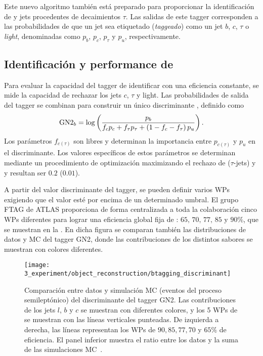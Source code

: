 Este nuevo algoritmo también está preparado para proporcionar la identificación de \cjets y jets procedentes de decaimientos \(\tau\). Las salidas de este tagger corresponden a las probabilidades de que un jet sea etiquetado (\textit{taggeado}) como un jet \(b\), \(c\), \(\tau\) o \textit{light}, denominadas como \(p_b\), \(p_c\), \(p_{\tau}\) y \(p_u\), respectivamente.

\subsection{Identificación y performance de \btagging}

Para evaluar la capacidad del tagger de identificar \bjets con una eficiencia constante, se mide la capacidad de rechazar los jets \(c\), \(\tau\) y light. Las probabilidades de salida del tagger se combinan para construir un único discriminante \gntb, definido como
\begin{equation}
    \text{GN2}_{b} = \log \left(
        \frac{p_b}{f_c p_c + f_{\tau} p_{\tau} + \left(1-f_c-f_{\tau}\right)p_u}
    \right).
\end{equation}
Los parámetros \(f_{c(\tau)}\) son libres y determinan la importancia entre \(p_{c(\tau)}\) y \(p_u\) en el discriminante. Los valores específicos de estos parámetros se determinan mediante un procedimiento de optimización maximizando el rechazo de \cjets (\(\tau\)-jets) y \ljets y resultan ser \(0.2\) (\(0.01\)).


A partir del valor discriminante del tagger, se pueden definir varios \acp{WP} exigiendo que el valor \gntb esté por encima de un determinado umbral. El grupo \ac{FTAG} de \ac{ATLAS} proporciona de forma centralizada a toda la colaboración cinco \acp{WP} diferentes para lograr una eficiencia global fija de \btagging: \(65,\, 70,\, 77,\, 85\) y \(90\%\), que se muestran en la \Fig{\ref{fig:objects:jet_tagging:btag_discrminant}}. En dicha figura se comparan también las distribuciones de datos y \ac{MC} del tagger GN2, donde las contribuciones de los distintos sabores se muestran con colores diferentes.

\begin{figure}[ht!]
    \centering
    \texttt{[image: 3\_experiment/object\_reconstruction/btagging\_discriminant]}
    \caption{Comparación entre datos y simulación \ac{MC} (eventos del proceso \ttbar semileptónico) del discriminante del tagger GN2. Las contribuciones de los jets \(l\), \(b\) y \(c\) se muestran con diferentes colores, y los 5 \acp{WP} de \btagging se muestran con las líneas verticales punteadas. De izquierda a derecha, las líneas representan los \acp{WP} de \(90, 85, 77, 70\) y \(65\%\) de eficiencia. El panel inferior muestra el ratio entre los datos y la suma de las simulaciones \ac{MC}~\cite{ATLAS-FTAG-GN2BtagWPs}.}
    \label{fig:objects:jet_tagging:btag_discrminant}
\end{figure}

